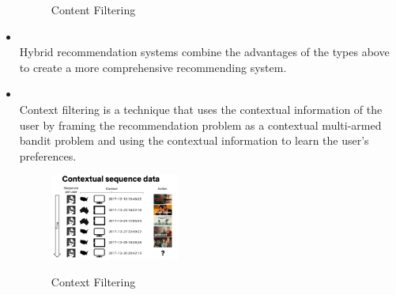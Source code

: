 \begin{itemize}
\begin{figure}[H]
        \caption{Content Filtering}
        \label{fig:content-filtering}
        \cite{NvidiaRecSys}
    \end{figure}
    \item {}\\Hybrid recommendation systems combine the advantages of the types above to create a more comprehensive recommending system.
    \item {}\\Context filtering is a technique that uses the contextual information of the user by framing the recommendation problem as a contextual multi-armed bandit problem and using the contextual information to learn the user's preferences.
    \begin{figure}[H]
        \centering
        \includegraphics[width=0.4\textwidth]{assets/contextual-sequence-prediction.png}
        \caption{Context Filtering}
        \label{fig:costextual-filtering}
        \cite{NvidiaRecSys}
    \end{figure}
\end{itemize}

